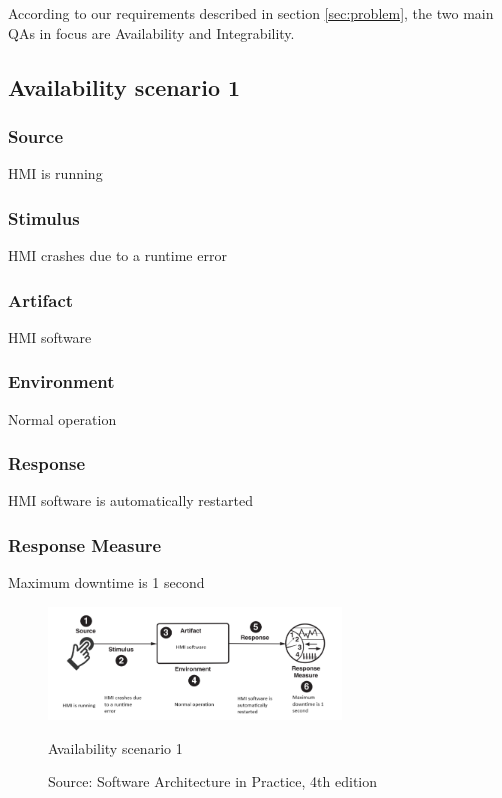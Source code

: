 According to our requirements described in section \ref{sec:problem}, the two main QAs in focus are Availability and Integrability.

\subsection{Availability scenario 1}

\subsubsection{Source}
HMI is running

\subsubsection{Stimulus}
HMI crashes due to a runtime error

\subsubsection{Artifact}
HMI software

\subsubsection{Environment}
Normal operation

\subsubsection{Response}
HMI software is automatically restarted

\subsubsection{Response Measure}
Maximum downtime is 1 second

\begin{figure}[h]
\centering
  \includegraphics[height=3cm]{images/qa_scenario_hmi_downtime.png}
  \caption{Availability scenario 1}
  \caption*{Source: Software Architecture in Practice, 4th edition \cite{bass2021software}}
  \label{fig:qa_availability_scenario_1}
\end{figure}

